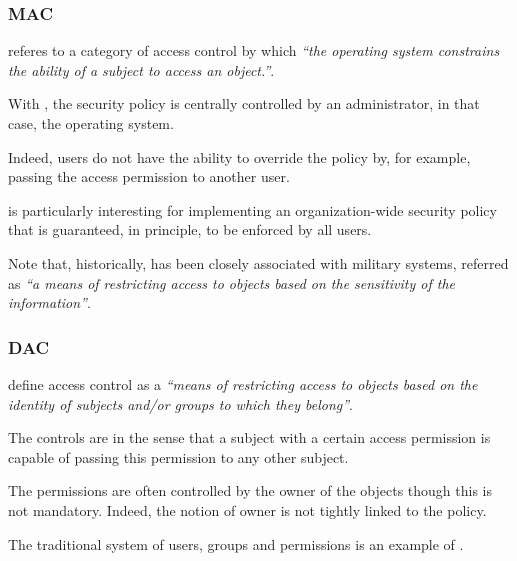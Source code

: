 \begin{frame}
  \frametitle{MAC}

   referes to a category of access control by which \textit{``the
  operating system constrains the ability of a subject to access an object.''}.

  \-

  With , the security policy is centrally controlled by an
  administrator, in that case, the operating system.

  \-

  Indeed, users do not have the ability to override the policy by, for
  example, passing the access permission to another user.

  \-

   is particularly interesting for implementing an organization-wide
  security policy that is guaranteed, in principle, to be enforced by all
  users.

  \-

  Note that, historically,  has been closely associated with
  military systems, referred as \textit{``a means of restricting access to
  objects based on the sensitivity of the information''}.
\end{frame}


\begin{frame}
  \frametitle{DAC}

   define access control as a \textit{``means of restricting access
  to objects based on the identity of subjects and/or groups to which they
  belong''}.

  \-

  The controls are  in the sense that a subject with a
  certain access permission is capable of passing this permission to any other
  subject.

  \-

  The permissions are often controlled by the owner of the objects though
  this is not mandatory. Indeed, the notion of owner is not tightly linked
  to the  policy.

  \-

  The traditional  system of users, groups and 
  permissions is an example of .
\end{frame}


